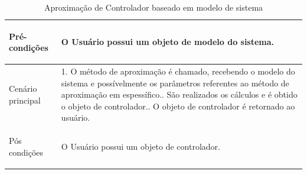 \begin{table}[!htbp]
\begin{center}
\begin{tabularx}{\textwidth}{|>{\bfseries\raggedright\arraybackslash\center}m{5cm}|X|}
            Pré-condições                                   & O Usuário possui um objeto de modelo do sistema.                                                                                                                                                                                                                                           \\ \hline
            Cenário principal                               & 1. O método de aproximação é chamado, recebendo o modelo do sistema e possívelmente os parâmetros referentes ao método de aproximação em espessífico.\newline 2. São realizados os cálculos e é obtido o objeto de controlador.\newline 3. O objeto de controlador é retornado ao usuário. \\ \hline
            Pós condições                                   & O Usuário possui um objeto de controlador.                                                                                                                                                                                                                                                 \\ \hline
        \end{tabularx}
        \caption{Aproximação de Controlador baseado em modelo de sistema}
        \label{tab:uc4}
    \end{center}
\end{table}

